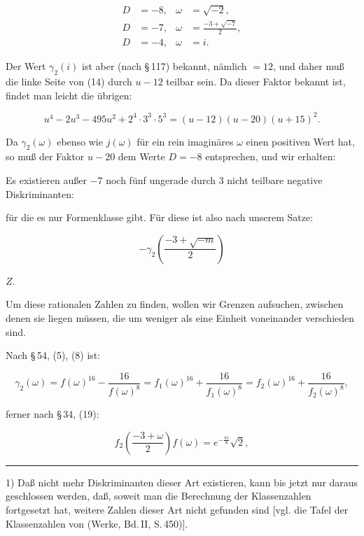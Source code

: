 
\[
\begin{aligned}
D &= -8, & \omega &= \sqrt{-2}, \\
D &= -7, & \omega &= \frac{-3+\sqrt{-7}}{2}, \\
D &= -4, & \omega &= i.
\end{aligned}
\]

Der Wert $\gamma_2(i)$ ist aber (nach \S\,117) bekannt, nämlich
$=12$, und daher muß die linke Seite von (14) durch $u-12$ teilbar
sein. Da dieser Faktor bekannt ist, findet man leicht die übrigen:

\[
u^4-2u^3-495u^2+2^4\cdot 3^3\cdot 5^3 = (u-12)(u-20)(u+15)^2.
\]

Da $\gamma_2(\omega)$ ebenso wie $j(\omega)$ für ein rein imaginäres
$\omega$ einen positiven Wert hat, so muß der Faktor $u-20$ dem
Werte $D = -8$ entsprechen, und wir erhalten:




Es existieren außer $-7$ noch fünf ungerade durch 3 nicht teilbare
negative Diskriminanten:


für die es nur  Formenklasse gibt. Für diese ist also nach
unserem Satze:

\[
-\gamma_2\left(\frac{-3+\sqrt{-m}}{2}\right)
\]

 $Z$.

Um diese rationalen Zahlen zu finden, wollen wir Grenzen aufsuchen,
zwischen denen sie liegen müssen, die um weniger als eine Einheit
voneinander verschieden sind.

Nach \S\,54, (5), (8) ist:

\[
\gamma_2(\omega) = f(\omega)^{16}-\frac{16}{f(\omega)^8} = f_1(\omega)^{16}+\frac{16}{f_1(\omega)^8} = f_2(\omega)^{16}+\frac{16}{f_2(\omega)^8},
\]

ferner nach \S\,34, (19):

\[
f_2\left(\frac{-3+\omega}{2}\right) f(\omega) = e^{-\frac{\pi i}{8}}\sqrt{2},
\]

\bigskip
\noindent\rule{4cm}{0.4pt}

\footnotesize
1) Daß nicht mehr Diskriminanten dieser Art existieren, kann bis
jetzt nur daraus geschlossen werden, daß, soweit man die Berechnung
der Klassenzahlen fortgesetzt hat, weitere Zahlen dieser Art nicht
gefunden sind [vgl. die Tafel der Klassenzahlen von
 (Werke, Bd.\,II, S.\,450)].
\normalsize

